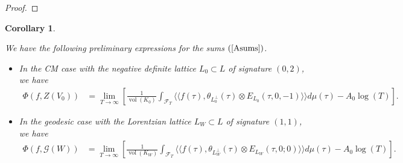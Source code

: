 \documentclass{amsart}
\newtheorem{corollary}[theorem]{Corollary}
\theoremstyle{definition}
\theoremstyle{definition}
\theoremstyle{definition}
\begin{document}
\begin{proof}
\end{proof}

\begin{corollary}\label{preliminary}

We have the following preliminary expressions for the sums $(\ref{Asums})$.\\

\begin{itemize}

\item[(i)] In the CM case with the negative definite lattice $L_0 \subset L$ of signature $(0,2)$, we have 
\begin{align*} \Phi(f, Z(V_0)) &= \lim_{T \rightarrow \infty} \left[
 \frac{1}{\operatorname{vol}(K_0)} \int_{\mathcal{F}_T} \langle \langle f(\tau), 
\theta_{L_0^{\perp}}(\tau) \otimes E_{L_0}(\tau, 0, -1) \rangle \rangle d \mu(\tau) - A_0 \log(T) \right]. \end{align*}  

\item[(ii)] In the geodesic case with the Lorentzian lattice $L_W \subset L$ of signature $(1,1)$, we have 
\begin{align*} \Phi(f, \mathcal{G}(W)) &= \lim_{T \rightarrow \infty} \left[  \frac{1}{\operatorname{vol}(K_W)} \int_{\mathcal{F}_T} \langle \langle f(\tau), 
\theta_{L_W^{\perp}}(\tau) \otimes E_{L_W}(\tau, 0; 0) \rangle \rangle d \mu(\tau) - A_0 \log(T) \right].\end{align*}  

\end{itemize}

\end{corollary}
\end{document}
